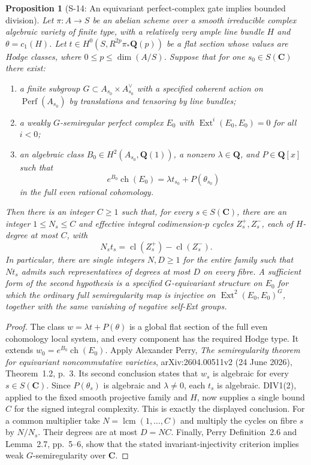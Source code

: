 \documentclass[11pt,a4paper]{article}
\newtheorem{proposition}[theorem]{Proposition}
\theoremstyle{definition}
\begin{document}
\begin{proposition}[S-14: An equivariant perfect-complex gate implies bounded division]
\label{prop:semireg-perry-bounded-division}
Let $\pi:A\to S$ be an abelian scheme over a smooth irreducible
complex algebraic variety of finite type, with a relatively very
ample line bundle $H$ and $\theta=c_1(H)$. Let
$t\in H^0(S,R^{2p}\pi_*\mathbf Q(p))$ be a flat section whose values
are Hodge classes, where $0\leq p\leq\dim(A/S)$.
Suppose that for one $s_0\in S(\mathbf C)$ there exist:
\begin{enumerate}
\item a finite subgroup $G\subset A_{s_0}\times A_{s_0}^{\vee}$
with a specified coherent action on $\operatorname{Perf}(A_{s_0})$
by translations and tensoring by line bundles;
\item a weakly $G$-semiregular perfect complex $E_0$ with
$\operatorname{Ext}^{i}(E_0,E_0)=0$ for all $i<0$;
\item an algebraic class $B_0\in H^2(A_{s_0},\mathbf Q(1))$,
a nonzero $\lambda\in\mathbf Q$, and $P\in\mathbf Q[x]$ such that
\[
 e^{B_0}\operatorname{ch}(E_0)=\lambda t_{s_0}+P(\theta_{s_0})
\]
in the full even rational cohomology.
\end{enumerate}
Then there is an integer $C\geq1$ such that, for every
$s\in S(\mathbf C)$, there are an integer $1\leq N_s\leq C$
and effective integral codimension-$p$ cycles $Z_s^+,Z_s^-$,
each of $H$-degree at most $C$, with
\[
 N_s t_s=\operatorname{cl}(Z_s^+)-\operatorname{cl}(Z_s^-).
\]
In particular, there are single integers $N,D\geq1$ for the entire
family such that $Nt_s$ admits such representatives of degrees
at most $D$ on every fibre.
A sufficient form of the second hypothesis is a specified
$G$-equivariant structure on $E_0$ for which the ordinary full
semiregularity map is injective on
$\operatorname{Ext}^2(E_0,E_0)^G$, together with the same vanishing
of negative self-Ext groups.
\end{proposition}
\begin{proof}
The class
$w=\lambda t+P(\theta)$ is a global flat section of the full even
cohomology local system, and every component has the required
Hodge type. It extends
$w_0=e^{B_0}\operatorname{ch}(E_0)$.
Apply Alexander Perry, \emph{The semiregularity theorem for
equivariant noncommutative varieties},
arXiv:2604.00511v2 (24 June 2026), Theorem~1.2, p.~3.
Its second conclusion states that $w_s$ is algebraic for every
$s\in S(\mathbf C)$. Since $P(\theta_s)$ is algebraic and
$\lambda\ne0$, each $t_s$ is algebraic.
DIV1(2), applied to the fixed smooth projective family and $H$,
now supplies a single bound $C$ for the signed integral complexity.
This is exactly the displayed conclusion.
For a common multiplier take $N=\operatorname{lcm}(1,\ldots,C)$
and multiply the cycles on fibre $s$ by $N/N_s$.
Their degrees are at most $D=NC$.
Finally, Perry Definition~2.6 and Lemma~2.7, pp.~5--6, show that
the stated invariant-injectivity criterion implies weak
$G$-semiregularity over $\mathbf C$.
\end{proof}
\end{document}
